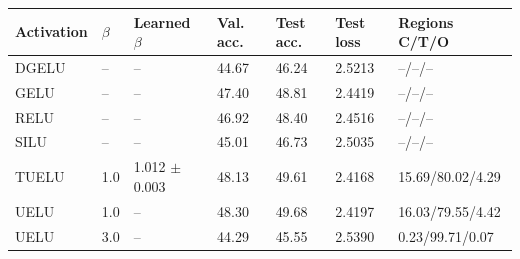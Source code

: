 \begin{tabular}{lllllll}
\toprule
Activation & $\beta$ & Learned $\beta$ & Val. acc. & Test acc. & Test loss & Regions C/T/O \\
\midrule
DGELU & -- & -- & 44.67 & 46.24 & 2.5213 & --/--/-- \\
GELU & -- & -- & 47.40 & 48.81 & 2.4419 & --/--/-- \\
RELU & -- & -- & 46.92 & 48.40 & 2.4516 & --/--/-- \\
SILU & -- & -- & 45.01 & 46.73 & 2.5035 & --/--/-- \\
TUELU & 1.0 & 1.012 $\pm$ 0.003 & 48.13 & 49.61 & 2.4168 & 15.69/80.02/4.29 \\
UELU & 1.0 & -- & 48.30 & 49.68 & 2.4197 & 16.03/79.55/4.42 \\
UELU & 3.0 & -- & 44.29 & 45.55 & 2.5390 & 0.23/99.71/0.07 \\
\bottomrule
\end{tabular}
